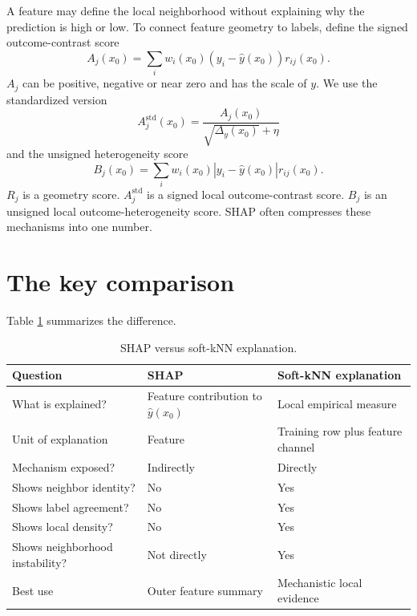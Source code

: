\documentclass[11pt]{article}
\newcommand{\1}{\mathbf{1}}
\begin{document}
A feature may define the local neighborhood without explaining why the prediction is high or low. To connect feature geometry to labels, define the signed outcome-contrast score
\begin{equation}
 A_j(x_0)=\sum_i w_i(x_0)(y_i-\hat y(x_0))r_{ij}(x_0).
 \label{eq:Aj}
\end{equation}
$A_j$ can be positive, negative or near zero and has the scale of $y$. We use the standardized version
\begin{equation}
 A_j^{\mathrm{std}}(x_0)=\frac{A_j(x_0)}{\sqrt{\Delta_y(x_0)}+\eta}
 \label{eq:Aj_standardized}
\end{equation}
and the unsigned heterogeneity score
\begin{equation}
 B_j(x_0)=\sum_i w_i(x_0)|y_i-\hat y(x_0)|r_{ij}(x_0).
 \label{eq:Bj}
\end{equation}
$R_j$ is a geometry score. $A_j^{\mathrm{std}}$ is a signed local outcome-contrast score. $B_j$ is an unsigned local outcome-heterogeneity score. SHAP often compresses these mechanisms into one number.

\section{The key comparison}

Table \ref{tab:comparison} summarizes the difference.

\begin{table}[H]
\centering
\caption{SHAP versus soft-kNN explanation.}
\label{tab:comparison}
\begin{tabular}{lll}
\toprule
Question & SHAP & Soft-kNN explanation \\
\midrule
What is explained? & Feature contribution to $\hat y(x_0)$ & Local empirical measure \\
Unit of explanation & Feature & Training row plus feature channel \\
Mechanism exposed? & Indirectly & Directly \\
Shows neighbor identity? & No & Yes \\
Shows label agreement? & No & Yes \\
Shows local density? & No & Yes \\
Shows neighborhood instability? & Not directly & Yes \\
Best use & Outer feature summary & Mechanistic local evidence \\
\bottomrule
\end{tabular}
\end{table}
\end{document}

